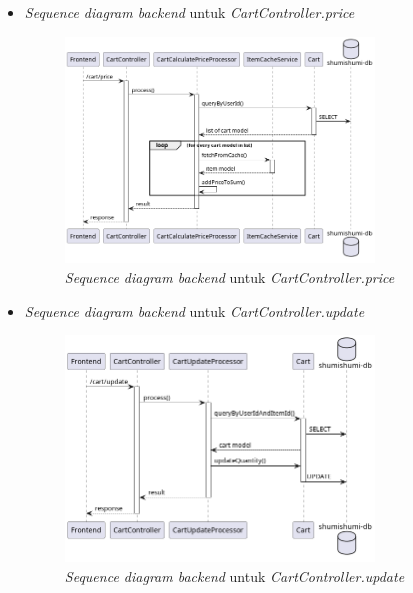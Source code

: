 \documentclass[a4paper]{article}
\begin{document}
\begin{enumerate}
\begin{enumerate}
\begin{itemize}
            \newpage
            \item \textit{Sequence diagram backend} untuk \textit{CartController.price}
            \begin{figure}[h]
                \centering
                \includegraphics*[height=6cm]{diagram/sequence diagram/BE/cart controller/price/price.png}
                \caption{\textit{Sequence diagram backend} untuk \textit{CartController.price}}
            \end{figure}

            \item \textit{Sequence diagram backend} untuk \textit{CartController.update}
            \begin{figure}[h]
                \centering
                \includegraphics*[height=6cm]{diagram/sequence diagram/BE/cart controller/update/update.png}
                \caption{\textit{Sequence diagram backend} untuk \textit{CartController.update}}
            \end{figure}


\end{itemize}
\end{enumerate}
\end{enumerate}
\end{document}

